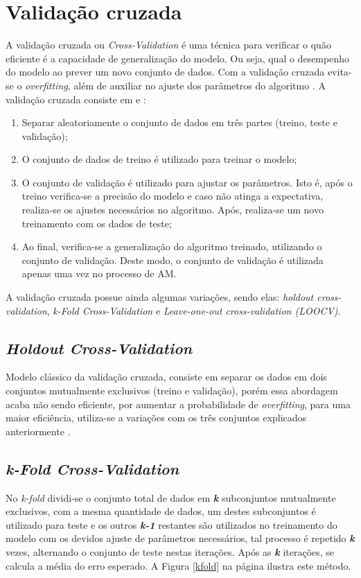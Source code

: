 \section{Validação cruzada}
\label{sc:crossvalidation}
A validação cruzada ou \textit{Cross-Validation} é uma técnica para verificar o quão eficiente é a capacidade de generalização do modelo. Ou seja, qual o desempenho do modelo ao prever um novo conjunto de dados. Com a validação cruzada evita-se o \textit{overfitting}, além de auxiliar no ajuste dos parâmetros do algoritmo \cite{james2013introduction}. A validação cruzada consiste em \cite{james2013introduction} e \cite{raschka2015python}:

\begin{enumerate}
    \item Separar aleatoriamente o conjunto de dados em três partes (treino, teste e validação);
    \item O conjunto de dados de treino é utilizado para treinar o modelo;
    \item O conjunto de validação é utilizado para ajustar os parâmetros. Isto é, após o treino verifica-se a precisão do modelo e caso não atinga a expectativa, realiza-se os ajustes necessários no algoritmo. Após, realiza-se um novo treinamento com os dados de teste;
    \item Ao final, verifica-se a generalização do algoritmo treinado, utilizando o conjunto de validação. Deste modo, o conjunto de validação é utilizada apenas uma vez no processo de AM.
\end{enumerate}

A validação cruzada possue ainda algumas variações, sendo elas: \textit{holdout cross-validation}, \textit{k-Fold Cross-Validation} e \textit{Leave-one-out cross-validation (LOOCV)}.


\subsection{\textit{Holdout Cross-Validation}}
Modelo clássico da validação cruzada, consiste em separar os dados em dois conjuntos mutualmente exclusivos (treino e validação), porém essa abordagem acaba não sendo eficiente, por aumentar a probabilidade de \textit{overfitting}, para uma maior eficiência, utiliza-se a variações com os três conjuntos explicados anteriormente \cite{raschka2015python}.

\subsection{\textit{k-Fold Cross-Validation}}
No \textit{k-fold} dividi-se o conjunto total de dados em \textbf{\textit{k}} subconjuntos mutualmente exclusivos, com a mesma quantidade de dados, um destes subconjuntos é utilizado para teste e os outros \textbf{\textit{k-1}} restantes são utilizados no treinamento do modelo com os devidos ajuste de parâmetros necessários, tal processo é repetido \textbf{\textit{k}} vezes, alternando o conjunto de teste nestas iterações. Após as \textbf{\textit{k}} iterações, se calcula a média do erro esperado. A Figura \ref{kfold} na página \pageref{kfold} ilustra este método.


